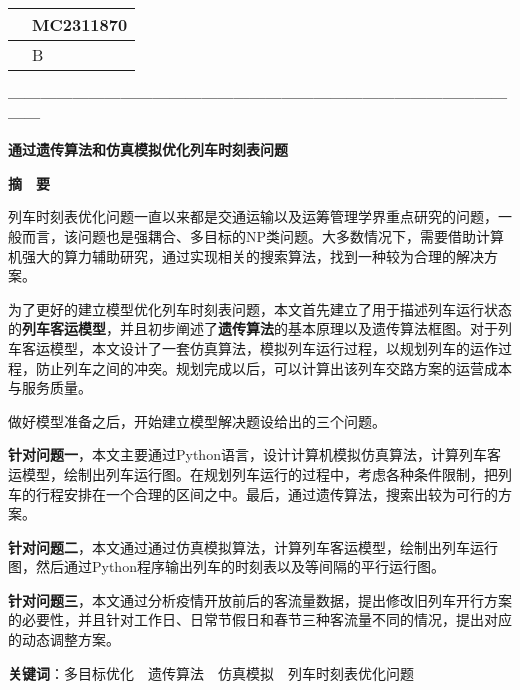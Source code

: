 \thispagestyle{empty}   %

\begin{table}[h]
    \centering
    \renewcommand\arraystretch{2}
    \begin{tabular}{|l|l|}
    \hline
    \quad & MC2311870\quad \\ \hline
       & B         \\ \hline
    \end{tabular}
\end{table}



\begin{center}
    \textbf{—————————————————————————————————}

    \textbf{\fontsize{20}{1.5}通过遗传算法和仿真模拟优化列车时刻表问题}

    \textbf{摘　要}
\end{center}





%
%

列车时刻表优化问题一直以来都是交通运输以及运筹管理学界重点研究的问题，一般而言，该问题也是强耦合、多目标的NP类问题。大多数情况下，需要借助计算机强大的算力辅助研究，通过实现相关的搜索算法，找到一种较为合理的解决方案\cite{niuGuidaoliecheshikebiaowentiyanjiuzongshu2021}。

为了更好的建立模型优化列车时刻表问题，本文首先建立了用于描述列车运行状态的\textbf{列车客运模型}，并且初步阐述了\textbf{遗传算法}的基本原理以及遗传算法框图。对于列车客运模型，本文设计了一套仿真算法，模拟列车运行过程，以规划列车的运作过程，防止列车之间的冲突。规划完成以后，可以计算出该列车交路方案的运营成本与服务质量。

做好模型准备之后，开始建立模型解决题设给出的三个问题。

\textbf{针对问题一}，本文主要通过Python语言，设计计算机模拟仿真算法，计算列车客运模型，绘制出列车运行图。在规划列车运行的过程中，考虑各种条件限制，把列车的行程安排在一个合理的区间之中。最后，通过遗传算法，搜索出较为可行的方案。

\textbf{针对问题二}，本文通过通过仿真模拟算法，计算列车客运模型，绘制出列车运行图，然后通过Python程序输出列车的时刻表以及等间隔的平行运行图。

\textbf{针对问题三}，本文通过分析疫情开放前后的客流量数据，提出修改旧列车开行方案的必要性，并且针对工作日、日常节假日和春节三种客流量不同的情况，提出对应的动态调整方案。\newline

\textbf{关键词}：多目标优化　遗传算法　仿真模拟　列车时刻表优化问题




%
%

\newpage
\tableofcontents
\thispagestyle{empty}